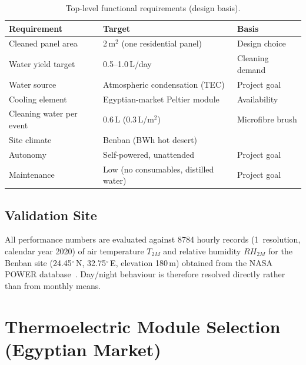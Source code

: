 \documentclass[12pt,a4paper]{report}
\newcommand{\num}[1]{#1}
\newcommand{\ang}[1]{#1\ensuremath{^{\circ}}}
\newcommand{\SI}[2]{#1\,\mbox{#2}}
\newcommand{\SIrange}[3]{#1--#2\,\mbox{#3}}
\newcommand{\per}{/}
\newcommand{\meter}{m}\newcommand{\metre}{m}
\newcommand{\liter}{L}\newcommand{\litre}{L}
\newcommand{\dy}{day}\newcommand{\yr}{yr}
\newcommand{\sqm}{m\ensuremath{^{2}}}
\begin{document}
\begin{table}[H]
  \centering
  \caption{Top-level functional requirements (design basis).}
  \label{tab:requirements}
  \begin{tabular}{lll}
    \toprule
    \textbf{Requirement} & \textbf{Target} & \textbf{Basis}\\
    \midrule
    Cleaned panel area            & \SI{2}{\sqm} (one residential panel) & Design choice\\
    Water yield target            & \SIrange{0.5}{1.0}{\liter\per\dy}            & Cleaning demand\\
    Water source                  & Atmospheric condensation (TEC)                & Project goal\\
    Cooling element               & Egyptian-market Peltier module                & Availability\\
    Cleaning water per event      & \SI{0.6}{\liter} (\SI{0.3}{\liter\per\sqm})  & Microfibre brush\\
    Site climate                  & Benban (BWh hot desert)                       & \cite{benban_irena}\\
    Autonomy                      & Self-powered, unattended                      & Project goal\\
    Maintenance                   & Low (no consumables, distilled water)         & Project goal\\
    \bottomrule
  \end{tabular}
\end{table}

\section{Validation Site}
All performance numbers are evaluated against \num{8784} hourly records
(\SI{1}{\hour} resolution, calendar year 2020) of air temperature $T_{2M}$ and
relative humidity $RH_{2M}$ for the Benban site (\ang{24.45}\,N, \ang{32.75}\,E,
elevation \SI{180}{\meter}) obtained from the NASA POWER
database~\cite{nasa_power}. Day/night behaviour is therefore resolved directly
rather than from monthly means.

\chapter{Thermoelectric Module Selection (Egyptian Market)}
\label{ch:tec}
\end{document}
